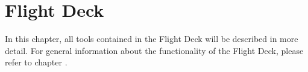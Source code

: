 
\chapter{Flight Deck}
\label{chap:flight_deck}

In this chapter, all tools contained in the Flight Deck will be described in more detail.
For general information about the functionality of the Flight Deck, please refer to chapter .







